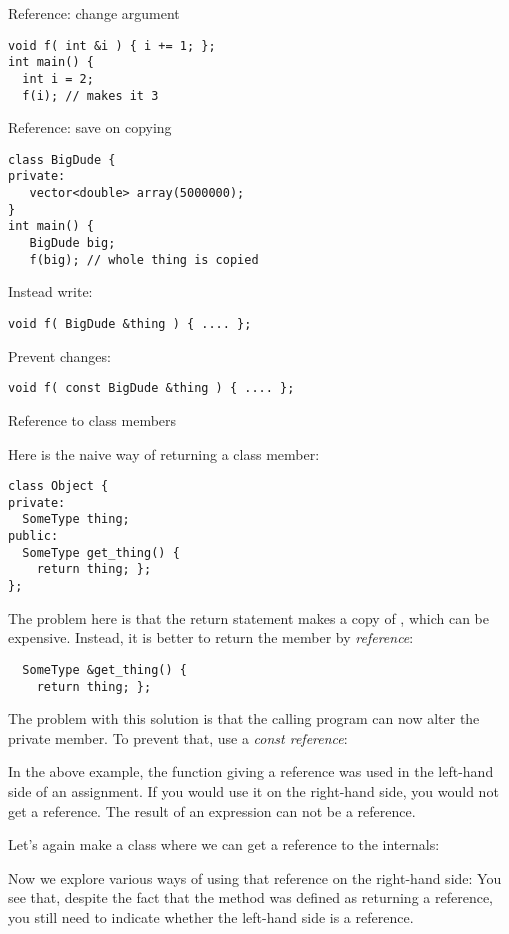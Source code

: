 \begin{block}{Reference: change argument}
\label{sl:refarg-change}
\begin{verbatim}
void f( int &i ) { i += 1; };
int main() {
  int i = 2;
  f(i); // makes it 3
\end{verbatim}
\end{block}

\begin{block}{Reference: save on copying}
\label{sl:refarg-nocopy}
\begin{verbatim}
class BigDude {
private:
   vector<double> array(5000000);
}
int main() {
   BigDude big;
   f(big); // whole thing is copied
\end{verbatim}
Instead write:
\begin{verbatim}
void f( BigDude &thing ) { .... };
\end{verbatim}
Prevent changes:
\begin{verbatim}
void f( const BigDude &thing ) { .... };
\end{verbatim}
\end{block}

 {Reference to class members}
\label{sec:class-ref}

Here is the naive way of returning a class member:
\begin{verbatim}
class Object {
private:
  SomeType thing;
public:
  SomeType get_thing() {
    return thing; };
};
\end{verbatim}
The problem here is that the return statement makes a copy of
, which can be expensive. Instead, it is better to return the
member by \emph{reference}:
\begin{verbatim}
  SomeType &get_thing() { 
    return thing; };
\end{verbatim}
The problem with this solution is that the calling program can now
alter the private member. To prevent that, use a
\emph{const reference}:
%

In the above example, the function giving a reference was used in the left-hand side of
an assignment. If you would use it on the right-hand side, you would
not get a reference. The result of an expression can not be a
reference.

Let's again make a class where we can get a reference to the
internals:
%

Now we explore various ways of using that reference on the right-hand
side:
%
%
You see that, despite the fact that the method  was defined as
returning a reference, you still need to indicate whether the
left-hand side is a reference.

